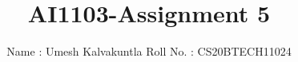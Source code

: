 \documentclass[journal,12pt,twocolumn]{IEEEtran}
\DeclareMathOperator*{\Res}{Res}
\begin{document}
\newcommand{\BEQA}{\begin{eqnarray}}
\newcommand{\EEQA}{\end{eqnarray}}
\newcommand{\define}{\stackrel{\triangle}{=}}

\raggedbottom
\setlength{\parindent}{0pt}
\providecommand{\mbf}{\mathbf}
\providecommand{\pr}[1]{\ensuremath{\Pr\left(#1\right)}}
\providecommand{\qfunc}[1]{\ensuremath{Q\left(#1\right)}}
\providecommand{\sbrak}[1]{\ensuremath{{}\left[#1\right]}}
\providecommand{\lsbrak}[1]{\ensuremath{{}\left[#1\right.}}
\providecommand{\rsbrak}[1]{\ensuremath{{}\left.#1\right]}}
\providecommand{\brak}[1]{\ensuremath{\left(#1\right)}}
\providecommand{\lbrak}[1]{\ensuremath{\left(#1\right.}}
\providecommand{\rbrak}[1]{\ensuremath{\left.#1\right)}}
\providecommand{\cbrak}[1]{\ensuremath{\left\{#1\right\}}}
\providecommand{\lcbrak}[1]{\ensuremath{\left\{#1\right.}}
\providecommand{\rcbrak}[1]{\ensuremath{\left.#1\right\}}}
\theoremstyle{remark}
\newtheorem{rem}{Remark}
\newcommand{\sgn}{\mathop{\mathrm{sgn}}}
\providecommand{\abs}[1]{\vert#1\vert}
\providecommand{\res}[1]{\Res\displaylimits_{#1}} 
\providecommand{\norm}[1]{\lVert#1\rVert}
\providecommand{\mtx}[1]{\mathbf{#1}}
\providecommand{\mean}[1]{E[ #1 ]}
\providecommand{\fourier}{\overset{\mathcal{F}}{ \rightleftharpoons}}
\providecommand{\system}{\overset{\mathcal{H}}{ \longleftrightarrow}}
\newcommand{\solution}{\noindent \textbf{Solution: }}
\newcommand{\cosec}{\,\text{cosec}\,}
\providecommand{\dec}[2]{\ensuremath{\overset{#1}{\underset{#2}{\gtrless}}}}
\newcommand{\myvec}[1]{\ensuremath{\begin{pmatrix}#1\end{pmatrix}}}
\newcommand{\mydet}[1]{\ensuremath{\begin{vmatrix}#1\end{vmatrix}}}
\makeatletter
{}
\makeatother
\let\StandardTheFigure\thefigure
\let\vec\mathbf
\renewcommand{\thefigure}{\theproblem}
\def\putbox#1#2#3{\makebox[0in][l]{\makebox[#1][l]{}\raisebox{\baselineskip}[0in][0in]{\raisebox{#2}[0in][0in]{#3}}}}
     \def\rightbox#1{\makebox[0in][r]{#1}}
     \def\centbox#1{\makebox[0in]{#1}}
     \def\topbox#1{\raisebox{-\baselineskip}[0in][0in]{#1}}
     \def\midbox#1{\raisebox{-0.5\baselineskip}[0in][0in]{#1}}
\vspace{3cm}
\title{AI1103-Assignment 5}
\author{Name : Umesh Kalvakuntla     Roll No. : CS20BTECH11024}
\maketitle
\newpage
\bigskip
\renewcommand{\thefigure}{\theenumi}
\renewcommand{\thetable}{\theenumi}
\end{document}
